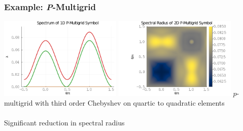 \documentclass{beamer}
\begin{document}

\begin{frame}
\begin{center}
\frametitle{Example: {\textit P}-Multigrid}

\includegraphics[height=3.9cm]{../img/pmultigridSymbol1D}
\includegraphics[height=3.9cm]{../img/pmultigridSymbol2D}
{\small $p$-multigrid with third order Chebyshev on quartic to quadratic elements}\\

~\\

Significant reduction in spectral radius

\end{center}
\end{frame}

\end{document}
